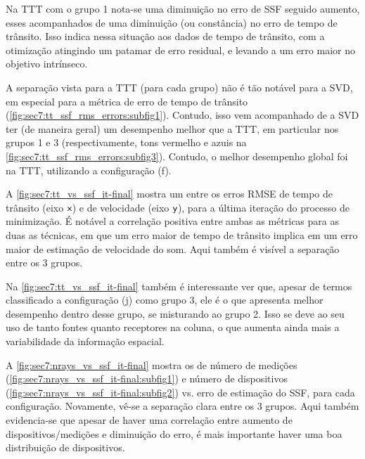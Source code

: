 \const Na TTT com o grupo 1 nota-se uma diminuição no erro de SSF seguido aumento, esses acompanhados de uma diminuição (ou constância) no erro de tempo de trânsito. Isso indica  nessa situação aos dados de tempo de trânsito, com a otimização atingindo um patamar de erro residual, e levando a um erro maior no objetivo intrínseco.

\const A separação vista para a TTT (para cada grupo) não é tão notável para a SVD, em especial para a métrica de erro de tempo de trânsito (\cref{fig:sec7:tt_ssf_rms_errors:subfig1}). Contudo, isso vem acompanhado de a SVD ter (de maneira geral) um desempenho melhor que a TTT, em particular nos grupos 1 e 3 (respectivamente, tons vermelho e azuis na \cref{fig:sec7:tt_ssf_rms_errors:subfig3}). Contudo, o melhor desempenho global foi na TTT, utilizando a configuração (f).

\const A \cref{fig:sec7:tt_vs_ssf_it-final} mostra um  entre os erros RMSE de tempo de trânsito (eixo ${\textsf{x}}$) e de velocidade (eixo ${\textsf{y}}$), para a última iteração do processo de minimização. É notável a correlação positiva entre ambas as métricas para as duas as técnicas, em que um erro maior de tempo de trânsito implica em um erro maior de estimação de velocidade do som. Aqui também é visível a separação entre os 3 grupos.

\const Na \cref{fig:sec7:tt_vs_ssf_it-final} também é interessante ver que, apesar de termos classificado a configuração (j) como grupo 3, ele é o que apresenta melhor desempenho dentro desse grupo, se misturando ao grupo 2. Isso se deve ao seu uso de tanto fontes quanto receptores na coluna, o que aumenta ainda mais a variabilidade da informação espacial.




\const A \cref{fig:sec7:nrays_vs_ssf_it-final} mostra os  de número de medições (\cref{fig:sec7:nrays_vs_ssf_it-final:subfig1}) e número de dispositivos (\cref{fig:sec7:nrays_vs_ssf_it-final:subfig2}) vs. erro de estimação do SSF, para cada configuração. Novamente, vê-se a separação clara entre os 3 grupos. Aqui também evidencia-se que apesar de haver uma correlação entre aumento de dispositivos/medições e diminuição do erro, é mais importante haver uma boa distribuição de dispositivos.

